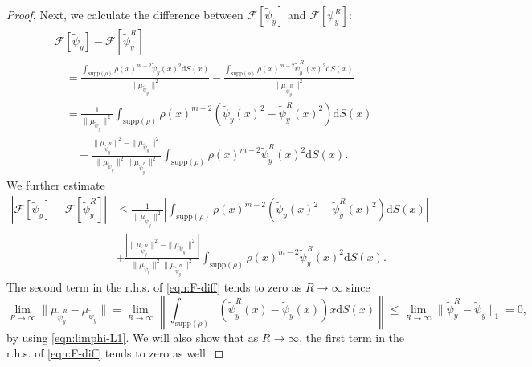 \documentclass[11pt]{amsart}
\newcommand{\dx}{\mathrm{d}S (x)}
\newcommand{\supp}{\mathrm{supp}(\rho)}
\begin{document}
\begin{proof}
Next, we calculate the difference between $\mathcal{F}[\tilde{\psi}_y]$ and $\mathcal{F}[\psi_{y}^R]$:
\begin{align*}
&\mathcal{F}[\tilde{\psi}_y]-\mathcal{F}[\tilde{\psi}_y^R]\\[2pt]
&\quad =\frac{\int_{\supp}\rho(x)^{m-2}\tilde{\psi}_y(x)^2\dx}{\|\mu_{\tilde{\psi}_y}\|^2}-\frac{\int_{\supp}\rho(x)^{m-2}\tilde{\psi}_y^R(x)^2\dx}{\|\mu_{\tilde{\psi}_y^R}\|^2}\\
&\quad =\frac{1}{\|\mu_{\tilde{\psi}_y}\|^2}\int_{\supp}\rho(x)^{m-2}\left(\tilde{\psi}_y(x)^2-\tilde{\psi}_y^R(x)^2\right)\dx\\[2pt]
&\qquad +\frac{\|\mu_{\tilde{\psi}_{y}^R}\|^2-\|\mu_{\tilde{\psi}_y}\|^2}{\|\mu_{\tilde{\psi}_y}\|^2\|\mu_{\tilde{\psi}_{y}^R}\|^2}\int_{\supp}\rho(x)^{m-2}\tilde{\psi}_y^R(x)^2\dx.
\end{align*}
We further estimate
\begin{equation}
\label{eqn:F-diff}
\begin{aligned}
\left|\mathcal{F}[\tilde{\psi}_y]-\mathcal{F}[\tilde{\psi}_y^R]\right|&\leq
\frac{1}{\|\mu_{\tilde{\psi}_y}\|^2}\left|
\int_{\supp}\rho(x)^{m-2}(\tilde{\psi}_y(x)^2-\tilde{\psi}_y^R(x)^2)\dx\right|
\\
&+\frac{\left|\|\mu_{\tilde{\psi}_{y}^R}\|^2-\|\mu_{\tilde{\psi}_y}\|^2\right|}{\|\mu_{\tilde{\psi}_y}\|^2\|\mu_{\tilde{\psi}_{y}^R}\|^2}
\int_{\supp}\rho(x)^{m-2}\tilde{\psi}_y^R(x)^2\dx.
\end{aligned}
\end{equation}
The second term in the r.h.s. of \eqref{eqn:F-diff} tends to zero as $R\to\infty$ since
\[
\lim_{R\to\infty}\|\mu_{\tilde{\psi}_y^R}-\mu_{\tilde{\psi}_y}\|=\lim_{R\to\infty}\left\|\int_{\supp}(\tilde{\psi}_y^R(x)-\tilde{\psi}_y(x))x\dx\right\|\leq \lim_{R\to\infty} \|\tilde{\psi}_y^R-\tilde{\psi}_y\|_1=0,
\]
by using \eqref{eqn:limphi-L1}. We will also show that as $R \to \infty$, the first term in the r.h.s. of \eqref{eqn:F-diff} tends to zero as well. 


\end{proof}
\end{document}
